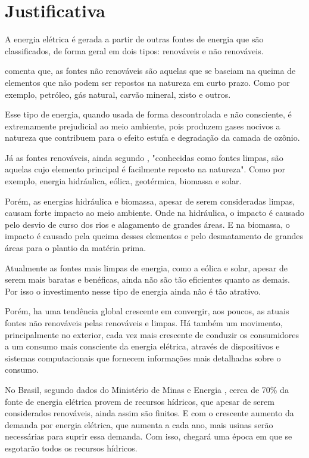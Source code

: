 \section{Justificativa}
A energia elétrica é gerada a partir de outras fontes de energia que são classificados, de forma geral em dois tipos: renováveis e não renováveis.

 comenta que, as fontes não renováveis são aquelas que se baseiam na queima de elementos que não podem ser repostos na natureza em curto prazo. Como por exemplo, petróleo, gás natural, carvão mineral, xisto e outros.

Esse tipo de energia, quando usada de forma descontrolada e não consciente, é extremamente prejudicial ao meio ambiente, pois produzem gases nocivos a natureza que contribuem para o efeito estufa e degradação da camada de ozônio.

Já as fontes renováveis, ainda segundo , "conhecidas como fontes limpas, são aquelas cujo elemento principal é facilmente reposto na natureza". Como por exemplo, energia hidráulica, eólica, geotérmica, biomassa e solar.

Porém, as energias hidráulica e biomassa, apesar de serem consideradas limpas, causam forte impacto ao meio ambiente. Onde na hidráulica, o impacto é causado pelo desvio de curso dos rios e alagamento de grandes áreas. E na biomassa, o impacto é causado pela queima desses elementos e pelo desmatamento de grandes áreas para o plantio da matéria prima.

Atualmente as fontes mais limpas de energia, como a eólica e solar, apesar de serem mais baratas e benéficas, ainda não são tão eficientes quanto as demais. Por isso o investimento nesse tipo de energia ainda não é tão atrativo.

Porém, ha uma tendência global crescente em convergir, aos poucos, as atuais fontes não renováveis pelas renováveis e limpas. Há também um movimento, principalmente no exterior, cada vez mais crescente de conduzir os consumidores a um consumo mais consciente da energia elétrica, através de dispositivos e sistemas computacionais que fornecem informações mais detalhadas sobre o consumo.

No Brasil, segundo dados do Ministério de Minas e Energia , cerca de 70\% da fonte de energia elétrica provem de recursos hídricos, que apesar de serem considerados renováveis, ainda assim são finitos. E com o crescente aumento da demanda por energia elétrica, que aumenta a cada ano, mais usinas serão necessárias para suprir essa demanda. Com isso, chegará uma época em que se esgotarão todos os recursos hídricos.


